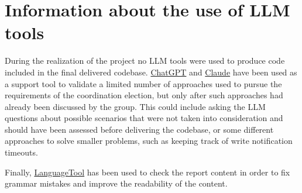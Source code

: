 \newpage
\section{Information about the use of LLM tools}

During the realization of the project no LLM tools were used to produce code included in the final delivered codebase. \href{https://chatgpt.com/}{ChatGPT} and \href{https://claude.ai/}{Claude} have been used as a support tool to validate a limited number of approaches used to pursue the requirements of the coordination election, but only after such approaches had already been discussed by the group. This could include asking the LLM questions about possible scenarios that were not taken into consideration and should have been assessed before delivering the codebase, or some different approaches to solve smaller problems, such as keeping track of write notification timeouts.

Finally, \href{https://languagetool.org/}{LanguageTool} has been used to check the report content in order to fix grammar mistakes and improve the readability of the content.